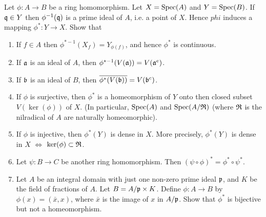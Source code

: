 \documentclass{article}
\begin{document}
\begin{exercise} \label{ex1-21}
    Let \(\phi : A \to B\) be a ring homomorphism.
    Let \(X = \operatorname{Spec}(A)\) and \(Y = \operatorname{Spec}(B)\).
    If \(\mathfrak{q} \in Y\) then \(\phi^{-1}(\mathfrak{q})\) is a prime ideal of \(A\), i.e. a point of \(X\).
    Hence \(phi\) induces a mapping \(\phi^* : Y \to X\).
    Show that
    \begin{enumerate}
        \item
            If \(f \in A\) then \(\phi^{*-1} (X_f) = Y_{\phi(f)}\), and hence \(\phi^*\) is continuous.
        \item
            If \(\mathfrak{a}\) is an ideal of \(A\), then \(\phi^{*-1}(V(\mathfrak{a})) = V(\mathfrak{a}^e)\).
        \item
            If \(\mathfrak{b}\) is an ideal of \(B\), then \(\overline{\phi^*(V(\mathfrak{b}))} = V(\mathfrak{b}^c)\).
        \item
            If \(\phi\) is surjective, then \(\phi^*\) is a homeomorphism of \(Y\) onto then closed subset \(V(\ker(\phi))\) of \(X\).
            (In particular, \(\operatorname{Spec}(A)\) and \(\operatorname{Spec}(A/\mathfrak{R})\) (where \(\mathfrak{R}\) is the nilradical of \(A\) are naturally homeomorphic).
        \item
            If \(\phi\) is injective, then \(\phi^*(Y)\) is dense in \(X\).
            More precisely, \(\phi^*(Y)\) is dense in \(X\) \(\iff\) \(\ker(\phi) \subset \mathfrak{R}\).
        \item
            Let \(\psi : B \to C\) be another ring homomorphism.
            Then \((\psi \circ \phi)^* = \phi^* \circ \psi^*\).
        \item
            Let \(A\) be an integral domain with just one non-zero prime ideal \(\mathfrak{p}\), and \(K\) be the field of fractions of \(A\).
            Let \(B = A/\mathfrak{p} \times K\).
            Define \(\phi : A \to B\) by \(\phi(x) = (\bar{x}, x)\), where \(\bar{x}\) is the image of \(x\) in \(A/\mathfrak{p}\).
            Show that \(\phi^*\) is bijective but not a homeomorphism.
    \end{enumerate}
\end{exercise}
\end{document}
